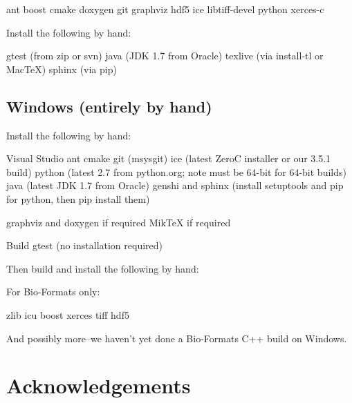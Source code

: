 \documentclass{beamer}
\begin{document}
ant
boost
cmake
doxygen
git
graphviz
hdf5
ice
libtiff-devel
python
xerces-c

Install the following by hand:

gtest (from zip or svn)
java (JDK 1.7 from Oracle)
texlive (via install-tl or MacTeX)
sphinx (via pip)

\subsection{Windows (entirely by hand)}

Install the following by hand:

Visual Studio
ant
cmake
git (msysgit)
ice (latest ZeroC installer or our 3.5.1 build)
python (latest 2.7 from python.org; note must be 64-bit for 64-bit
builds)
java (latest JDK 1.7 from Oracle)
genshi and sphinx (install setuptools and pip for python, then pip install them)

graphviz and doxygen if required
MikTeX if required

Build gtest (no installation required)

Then build and install the following by hand:

For Bio-Formats only:

zlib
icu
boost
xerces
tiff
hdf5

And possibly more--we haven't yet done a Bio-Formats C++ build on Windows.

\section*{Acknowledgements}
\end{document}
